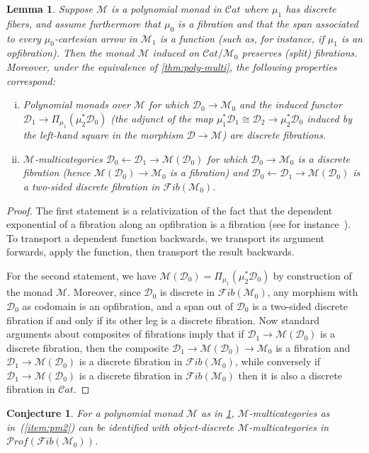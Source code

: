 \documentclass{article}
\newtheorem{lem}[thm]{Lemma}
\newtheorem{conj}[thm]{Conjecture}
\theoremstyle{definition}
\def\M{\mathcal{M}}
\def\Cat{\mathcal{C}\mathit{at}}
\def\Fib{\mathcal{F}\mathit{ib}}
\def\Prof{\mathcal{P}\mathit{rof}}
\def\D{\mathcal{D}}
\begin{document}
\begin{lem}\label{thm:poly-multi-2}
  Suppose $\M$ is a polynomial monad in $\Cat$ where $\mu_1$ has discrete fibers, and assume furthermore that $\mu_0$ is a fibration and that the span associated to every $\mu_0$-cartesian arrow in $\M_1$ is a function (such as, for instance, if $\mu_1$ is an opfibration).
  Then the monad $\M$ induced on $\Cat/\M_0$ preserves (split) fibrations.
  Moreover, under the equivalence of \cref{thm:poly-multi}, the following properties correspond:
  \begin{enumerate}[(i)]
  \item Polynomial monads over $\M$ for which $\D_0\to\M_0$ and the induced functor $\D_1\to \Pi_{\mu_1} (\mu_2^* \D_0)$ (the adjunct of the map $\mu_1^* \D_1 \cong \D_2 \to \mu_2 ^* \D_0$ induced by the left-hand square in the morphism $\D\to \M$) are discrete fibrations.\label{item:pm1}
  \item $\M$-multicategories $\D_0 \leftarrow \D_1 \to \M(\D_0)$ for which $\D_0\to \M_0$ is a discrete fibration (hence $\M(\D_0)\to\M_0$ is a fibration) and $\D_0 \leftarrow \D_1 \to \M(\D_0)$ is a two-sided discrete fibration in $\Fib (\M_0)$.\label{item:pm2}
  \end{enumerate}
\end{lem}
\begin{proof}
  The first statement is a relativization of the fact that the dependent exponential of a fibration along an opfibration is a fibration (see for instance~\cite[Lemma 4.4.2]{weber:poly-pb}).
  To transport a dependent function backwards, we transport its argument forwards, apply the function, then transport the result backwards.

  For the second statement, we have $\M(\D_0) = \Pi_{\mu_1} (\mu_2^* \D_0)$ by construction of the monad $\M$.
  Moreover, since $\D_0$ is discrete in $\Fib(\M_0)$, any morphism with $\D_0$ as codomain is an opfibration, and a span out of $\D_0$ is a two-sided discrete fibration if and only if its other leg is a discrete fibration.
  Now standard arguments about composites of fibrations imply that if $\D_1 \to \M(\D_0)$ is a discrete fibration, then the composite $\D_1 \to \M(\D_0) \to \M_0$ is a fibration and $\D_1 \to \M(\D_0)$ is a discrete fibration in $\Fib(\M_0)$, while conversely if $\D_1 \to \M(\D_0)$ is a discrete fibration in $\Fib(\M_0)$ then it is also a discrete fibration in $\Cat$.
\end{proof}

\begin{conj}\label{thm:poly-multi-3}
  For a polynomial monad $\M$ as in \cref{thm:poly-multi-2}, $\M$-multicategories as in~(\ref{item:pm2}) can be identified with object-discrete $\M$-multicategories in $\Prof(\Fib(\M_0))$.
\end{conj}
\end{document}
